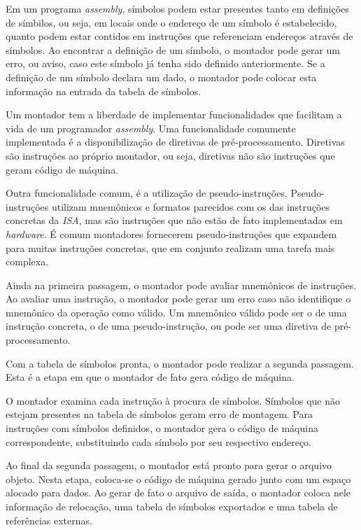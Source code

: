 Em um programa \textit{assembly}, símbolos podem estar presentes tanto em definições de símbilos, ou seja, em locais onde o endereço de um símbolo é estabelecido, quanto podem estar contidos em instruções que referenciam endereços através de símbolos. Ao encontrar a definição de um símbolo, o montador pode gerar um erro, ou aviso, caso este símbolo já tenha sido definido anteriormente. Se a definição de um símbolo declara um dado, o montador pode colocar esta informação na entrada da tabela de símbolos.

Um montador tem a liberdade de implementar funcionalidades que facilitam a vida de um programador \textit{assembly}. Uma funcionalidade comumente implementada é a disponibilização de diretivas de pré-processamento. Diretivas são instruções ao próprio montador, ou seja, diretivas não são instruções que geram código de máquina.

Outra funcionalidade comum, é a utilização de pseudo-instruções. Pseudo-instruções utilizam mnemônicos e formatos parecidos com os das instruções concretas da \textit{ISA}, mas são instruções que não estão de fato implementadas em \textit{hardware}. É comum montadores fornecerem pseudo-instruções que expandem para muitas instruções concretas, que em conjunto realizam uma tarefa mais complexa.

Ainda na primeira passagem, o montador pode avaliar mnemônicos de instruções. Ao avaliar uma instrução, o montador pode gerar um erro caso não identifique o mnemônico da operação como válido. Um mnemônico válido pode ser o de uma instrução concreta, o de uma pseudo-instrução, ou pode ser uma diretiva de pré-processamento.

Com a tabela de símbolos pronta, o montador pode realizar a segunda passagem. Esta é a etapa em que o montador de fato gera código de máquina. 

O montador examina cada instrução à procura de símbolos. Símbolos que não estejam presentes na tabela de símbolos geram erro de montagem. Para instruções com símbolos definidos, o montador gera o código de máquina correspondente, substituindo cada símbolo por seu respectivo endereço.

Ao final da segunda passagem, o montador está pronto para gerar o arquivo objeto. Nesta etapa, coloca-se o código de máquina gerado junto com um espaço alocado para dados. Ao gerar de fato o arquivo de saída, o montador coloca nele informação de relocação, uma tabela de símbolos exportados e uma tabela de referências externas.

